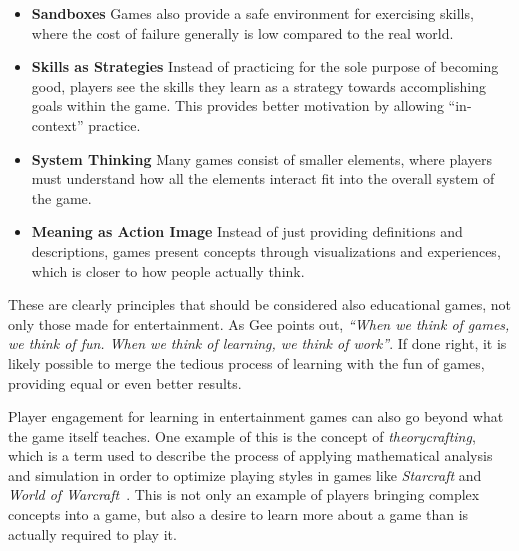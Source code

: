 \begin{itemize}
	\item{\textbf{Sandboxes}} Games also provide a safe environment for exercising skills, where the cost of failure generally is low compared to the real world.
	\item{\textbf{Skills as Strategies}} Instead of practicing for the sole purpose of becoming good, players see the skills they learn as a strategy towards accomplishing goals within the game. This provides better motivation by allowing ``in-context'' practice.
	\item{\textbf{System Thinking}} Many games consist of smaller elements, where players must understand how all the elements interact fit into the overall system of the game.
	\item{\textbf{Meaning as Action Image}} Instead of just providing definitions and descriptions, games present concepts through visualizations and experiences, which is closer to how people actually think.
\end{itemize}

\noindent
These are clearly principles that should be considered also educational games, not only those made for entertainment. As Gee points out, \emph{``When we think of games, we think of fun. When we think of learning, we think of work''}. If done right, it is likely possible to merge the tedious process of learning with the fun of games, providing equal or even better results.

\noindent
Player engagement for learning in entertainment games can also go beyond what the game itself teaches. One example of this is the concept of \emph{theorycrafting}, which is a term used to describe the process of applying mathematical analysis and simulation in order to optimize playing styles in games like \emph{Starcraft} and \emph{World of Warcraft}~\cite{paul:theorycrafting}. This is not only an example of players bringing complex concepts into a game, but also a desire to learn more about a game than is actually required to play it.

